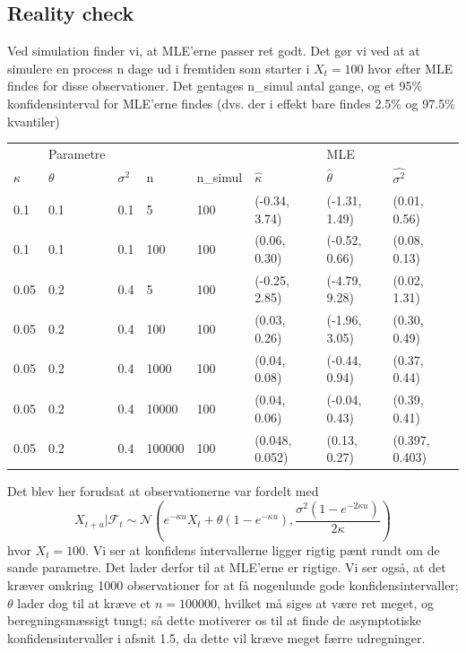 \documentclass{article}
\theoremstyle{definition}
\theoremstyle{remark}
\begin{document}
\subsection{Reality check}
Ved simulation finder vi, at MLE'erne passer ret godt. Det gør vi ved at at simulere en process n dage ud i fremtiden som starter i $X_t=100$  hvor efter MLE findes for disse observationer. Det gentages n\_simul antal gange, og et 95\% konfidensinterval for MLE'erne findes (dvs. der i effekt bare findes 2.5\% og 97.5\% kvantiler) 
\begin{center}
\begin{tabular}{llllllll}
 &Parametre&& &&& MLE  \\
 $\kappa$&$\theta$&$\sigma^2$&n&n\_simul&$\hat \kappa$&$\hat\theta$&$\hat{\sigma^2}$ \\
 0.1 & 0.1 & 0.1 & 5& 100 & (-0.34, 3.74)&(-1.31, 1.49)&(0.01, 0.56)\\
 0.1 & 0.1 & 0.1 & 100& 100 & (0.06, 0.30)&(-0.52, 0.66)&(0.08, 0.13)\\
 0.05&0.2&0.4&5&100&(-0.25, 2.85)&(-4.79, 9.28)&(0.02, 1.31)\\
 0.05&0.2&0.4&100&100&(0.03, 0.26)&(-1.96, 3.05)&(0.30, 0.49)\\
 0.05&0.2&0.4&1000&100&(0.04, 0.08)&(-0.44, 0.94)&(0.37, 0.44)\\
 0.05&0.2&0.4&10000&100&(0.04, 0.06)&(-0.04, 0.43)&(0.39, 0.41)\\
 \color{red}0.05&\color{red}0.2&\color{red}0.4&\color{red}100000&\color{red}100&\color{red}(0.048, 0.052)&\color{red}(0.13, 0.27)&\color{red}(0.397, 0.403)
\end{tabular}
\end{center}
Det blev her forudsat at observationerne var fordelt med 
$$X_{t+u}|\mathcal F_t\sim\mathcal N\left(e^{-\kappa u}X_t + \theta(1-e^{-\kappa u}),\frac{\sigma^2 (1-e^{-2\kappa u})}{2\kappa}\right)$$
hvor $X_t=100$. Vi ser at konfidens intervallerne ligger rigtig pænt rundt om de sande parametre. Det lader derfor til at MLE'erne er rigtige. Vi ser også, at det kræver omkring 1000 observationer for at få nogenlunde gode konfidensintervaller; $\theta$ \color{red}lader dog til at kræve et  $n=100000$, hvilket må siges at være ret meget, og beregningsmæssigt tungt;\color{black} så dette motiverer os til at finde de asymptotiske konfidensintervaller i afsnit 1.5, da dette vil kræve meget færre udregninger.  
\end{document}
